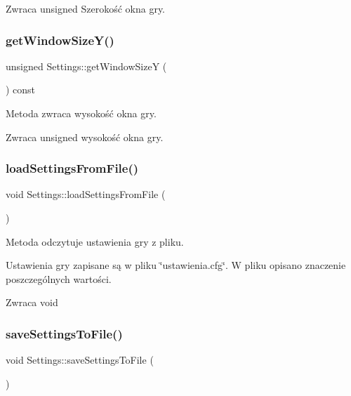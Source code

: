 \begin{DoxyReturn}{Zwraca}
unsigned Szerokość okna gry. 
\end{DoxyReturn}
\mbox{\label{class_settings_acb43ddf0e2d660810876f0a7c90dc3dc}} 
\subsubsection{getWindowSizeY()}
{\footnotesize\ttfamily unsigned Settings\+::get\+Window\+SizeY (\begin{DoxyParamCaption}{ }\end{DoxyParamCaption}) const}



Metoda zwraca wysokość okna gry. 

\begin{DoxyReturn}{Zwraca}
unsigned wysokość okna gry. 
\end{DoxyReturn}
\mbox{\label{class_settings_ae88096455ec038a9fe12bd1b80e5d21f}} 
\subsubsection{loadSettingsFromFile()}
{\footnotesize\ttfamily void Settings\+::load\+Settings\+From\+File (\begin{DoxyParamCaption}{ }\end{DoxyParamCaption})}



Metoda odczytuje ustawienia gry z pliku. 

Ustawienia gry zapisane są w pliku \char`\"{}ustawienia.\+cfg\char`\"{}. W pliku opisano znaczenie poszczególnych wartości.

\begin{DoxyReturn}{Zwraca}
void 
\end{DoxyReturn}
\mbox{\label{class_settings_aec6b99f8c4a2380ca7840781e3bdeb44}} 
\subsubsection{saveSettingsToFile()}
{\footnotesize\ttfamily void Settings\+::save\+Settings\+To\+File (\begin{DoxyParamCaption}{ }\end{DoxyParamCaption})}



